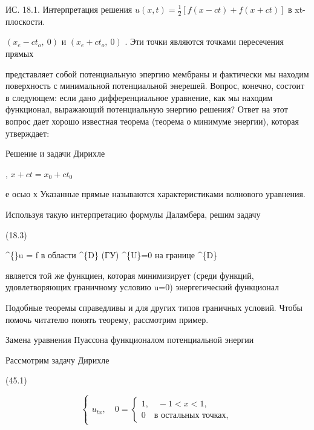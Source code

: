 \documentclass[
  ukrainian,
]{article}
\begin{document}
ИС. 18.1. Интерпретация решения
\(u(x, t) = \frac{1}{2} [f(x-ct)+f(x+ct)]\) в xt-плоскости.

\((x_{\mathrm{ }e}-ct_{\mathrm{ }o},\ 0)\) и
\((x_{\mathrm{ }e}+ct_{\mathrm{ }o},\ 0)\) . Эти точки являются точками
пересечения прямых

представляет собой потенциальную эпергию мембраны и фактически мы
находим поверхность с минимальной потенциальной энерешей. Вопрос,
конечно, состоит в следующем: если дано дифференциальное уравнение, как
мы находим функционал, выражающий потенциальную энергию решения? Ответ
на этот вопрос дает хорошо известная теорема (теорема о минимуме
энергии), которая утверждает:

Решение и задачи Дирихле

, \(x+ct=x_0+ct_0\)

е осью х Указанные прямые называются характеристиками волнового
уравнения.

Используя такую интерпретацию формулы Даламбера, решим задачу

(18.3)

\^{}\{\Lambda\}u = f в области \^{}\{D\} (ГУ) \^{}\{U\}=0 на границе
\^{}\{D\}

является той же функциен, которая минимизирует (среди функций,
удовлетворяющих граничному условию u=0) энергегический функционал

Подобные теоремы справедливы и для других типов граничных условий. Чтобы
помочь читателю понять теорему, рассмотрим пример.

Замена уравнения Пуассона функционалом потенциальной энергии

Рассмотрим задачу Дирихле

(45.1)

\[
\begin{cases} u_{tx}, \quad 0 = \begin{cases} 1, \quad -1 < x < 1, \\ 0 \quad \text{в остальных точках,} \end{cases} \end{cases}
\]
\end{document}
